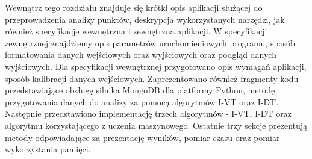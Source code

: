 Wewnątrz tego rozdziału znajduje się krótki opis aplikacji służącej do przeprowadzenia analizy punktów, deskrypcja wykorzystanych narzędzi, jak również specyfikacje wewnętrzna i zewnętrzna aplikacji. W specyfikacji zewnętrznej znajdziemy opis parametrów uruchomieniowych programu, sposób formatowania danych wejściowych oraz wyjściowych oraz podgląd danych wyjściowych. Dla specyfikacji wewnętrznej przygotowano opis wymagań aplikacji, sposób kalibracji danych wejściowych. Zaprezentowano również fragmenty kodu przedstawiające obsługę silnika MongoDB dla platformy Python, metodę przygotowania danych do analizy za pomocą algorytmów I-VT oraz I-DT. Następnie przedstawiono implementację trzech algorytmów - I-VT, I-DT oraz algorytmu korzystającego z uczenia maszynowego. Ostatnie trzy sekcje prezentują metody odpowiadające za prezentację wyników, pomiar czasu oraz pomiar wykorzystania pamięci. 
